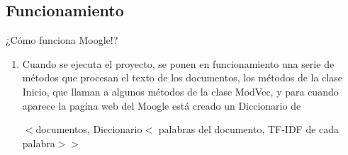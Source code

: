 \subsection{Funcionamiento}
\begin{frame}
    \centering
    {\large ¿Cómo funciona Moogle!? \par}
    \begin{enumerate}
        \item Cuando se ejecuta el proyecto,
              se ponen en funcionamiento una serie de métodos
              que procesan el texto de los documentos,
              los métodos de la clase Inicio, que llaman a
              algunos métodos de la clase ModVec, y para cuando
              aparece la pagina web del Moogle está creado un
              Diccionario de

              $<$documentos, Diccionario$<$ palabras del documento, TF-IDF de cada palabra$>>$

    \end{enumerate}



\end{frame}
